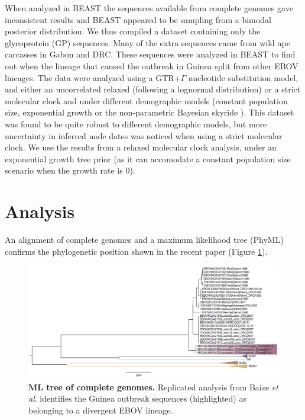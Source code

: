 \documentclass[11pt,oneside,letterpaper]{article}
\begin{document}
When analyzed in BEAST \cite{drummond2012} the sequences available from complete genomes gave inconsistent results and BEAST appeared to be sampling from a bimodal posterior distribution.
We thus compiled a dataset containing only the glycoprotein (GP) sequences.
Many of the extra sequences came from wild ape carcasses \cite{wittmann2007} in Gabon and DRC.
These sequences were analyzed in BEAST \cite{drummond2012} to find out when the lineage that caused the outbreak in Guinea split from other EBOV lineages.
The data were analyzed using a GTR+$\Gamma$ nucleotide substitution model, and either an uncorrelated relaxed (following a lognormal distribution) \cite{drummond2006} or a strict molecular clock and under different demographic models (constant population size, exponential growth or the non-parametric Bayesian skyride \cite{minin2008}).
This dataset was found to be quite robust to different demographic models, but more uncertainty in inferred node dates was noticed when using a strict molecular clock.
We use the results from a relaxed molecular clock analysis, under an exponential growth tree prior (as it can accomodate a constant population size scenario when the growth rate is 0).

\section*{Analysis}
An alignment of complete genomes and a maximum likelihood tree (PhyML) confirms the phylogenetic position shown in the recent paper \cite{baize2014} (Figure \ref{NEJMtree}).
\begin{figure}[h!]
\centering  
\includegraphics[width=1\textwidth]  {figures/ebolavirus_raw_ml_tree.png}
\caption{\textbf{ML tree of complete genomes.}
Replicated analysis from Baize \textit{et al}. \cite{baize2014} identifies the Guinea outbreak sequences (highlighted) as belonging to a divergent EBOV lineage.}
\label{NEJMtree}
\end{figure}
\end{document}

